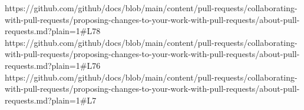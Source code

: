 https://github.com/github/docs/blob/main/content/pull-requests/collaborating-with-pull-requests/proposing-changes-to-your-work-with-pull-requests/about-pull-requests.md?plain=1#L78
https://github.com/github/docs/blob/main/content/pull-requests/collaborating-with-pull-requests/proposing-changes-to-your-work-with-pull-requests/about-pull-requests.md?plain=1#L76
https://github.com/github/docs/blob/main/content/pull-requests/collaborating-with-pull-requests/proposing-changes-to-your-work-with-pull-requests/about-pull-requests.md?plain=1#L7
